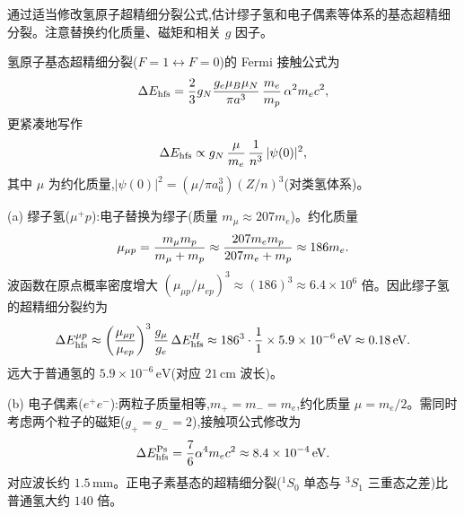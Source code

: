 \begin{question}
通过适当修改氢原子超精细分裂公式,估计缪子氢和电子偶素等体系的基态超精细分裂。注意替换约化质量、磁矩和相关 $g$ 因子。
\begin{solution}
氢原子基态超精细分裂($F=1\leftrightarrow F=0$)的 Fermi 接触公式为
\[
\Delta E_{\rm hfs} = {2\over3}g_N{g_e\mu_B\mu_N\over\pi a^3}\,{m_e\over m_p}\,\alpha^2 m_e c^2,
\]
更紧凑地写作
\[
\Delta E_{\rm hfs} \propto g_N\,{\mu\over m_e}\,{1\over n^3}\,|\psi(0)|^2,
\]
其中 $\mu$ 为约化质量,$|\psi(0)|^2=(\mu/\pi a_0^3)(Z/n)^3$(对类氢体系)。

(a) 缪子氢($\mu^+p$):电子替换为缪子(质量 $m_\mu\approx207 m_e$)。约化质量
\[
\mu_{\mu p} = {m_\mu m_p\over m_\mu+m_p} \approx {207 m_e m_p\over 207 m_e+m_p} \approx 186 m_e.
\]
波函数在原点概率密度增大 $(\mu_{\mu p}/\mu_{ep})^3 \approx (186)^3 \approx 6.4\times10^6$ 倍。因此缪子氢的超精细分裂约为
\[
\Delta E_{\rm hfs}^{\mu p} \approx \left({\mu_{\mu p}\over\mu_{ep}}\right)^3 {g_\mu\over g_e}\,\Delta E_{\rm hfs}^{H} \approx 186^3\cdot{1\over1}\times 5.9\times10^{-6}\,\mathrm{eV} \approx 0.18\,\mathrm{eV}.
\]
远大于普通氢的 $5.9\times10^{-6}\,\mathrm{eV}$(对应 $21\,\mathrm{cm}$ 波长)。

(b) 电子偶素($e^+e^-$):两粒子质量相等,$m_+=m_-=m_e$,约化质量 $\mu=m_e/2$。需同时考虑两个粒子的磁矩($g_+=g_-=2$),接触项公式修改为
\[
\Delta E_{\rm hfs}^{\rm Ps} = {7\over6}\alpha^4 m_e c^2 \approx 8.4\times10^{-4}\,\mathrm{eV}.
\]
对应波长约 $1.5\,\mathrm{mm}$。正电子素基态的超精细分裂($^1S_0$ 单态与 $^3S_1$ 三重态之差)比普通氢大约 $140$ 倍。
\end{solution}
\end{question}

